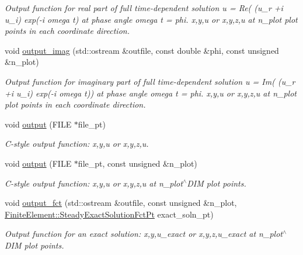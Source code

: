 \begin{DoxyCompactItemize}
\begin{DoxyCompactList}\small\item\em Output function for real part of full time-\/dependent solution u = Re( (u\+\_\+r +i u\+\_\+i) exp(-\/i omega t) at phase angle omega t = phi. x,y,u or x,y,z,u at n\+\_\+plot plot points in each coordinate direction. \end{DoxyCompactList}\item 
void \hyperlink{classoomph_1_1QPMLHelmholtzElement_a4d8f14902c2b6848a0209ffc90007a6b}{output\+\_\+imag} (std\+::ostream \&outfile, const double \&phi, const unsigned \&n\+\_\+plot)
\begin{DoxyCompactList}\small\item\em Output function for imaginary part of full time-\/dependent solution u = Im( (u\+\_\+r +i u\+\_\+i) exp(-\/i omega t)) at phase angle omega t = phi. x,y,u or x,y,z,u at n\+\_\+plot plot points in each coordinate direction. \end{DoxyCompactList}\item 
void \hyperlink{classoomph_1_1QPMLHelmholtzElement_acafc9a4a72c78e17f7d90b16263a196c}{output} (F\+I\+LE $\ast$file\+\_\+pt)
\begin{DoxyCompactList}\small\item\em C-\/style output function\+: x,y,u or x,y,z,u. \end{DoxyCompactList}\item 
void \hyperlink{classoomph_1_1QPMLHelmholtzElement_a9cfa0d9c0635140f394be49e15e58f93}{output} (F\+I\+LE $\ast$file\+\_\+pt, const unsigned \&n\+\_\+plot)
\begin{DoxyCompactList}\small\item\em C-\/style output function\+: x,y,u or x,y,z,u at n\+\_\+plot$^\wedge$\+D\+IM plot points. \end{DoxyCompactList}\item 
void \hyperlink{classoomph_1_1QPMLHelmholtzElement_a1697955b637445b14882b28ff8467f6e}{output\+\_\+fct} (std\+::ostream \&outfile, const unsigned \&n\+\_\+plot, \hyperlink{classoomph_1_1FiniteElement_a690fd33af26cc3e84f39bba6d5a85202}{Finite\+Element\+::\+Steady\+Exact\+Solution\+Fct\+Pt} exact\+\_\+soln\+\_\+pt)
\begin{DoxyCompactList}\small\item\em Output function for an exact solution\+: x,y,u\+\_\+exact or x,y,z,u\+\_\+exact at n\+\_\+plot$^\wedge$\+D\+IM plot points. \end{DoxyCompactList}\item 

\end{DoxyCompactItemize}
